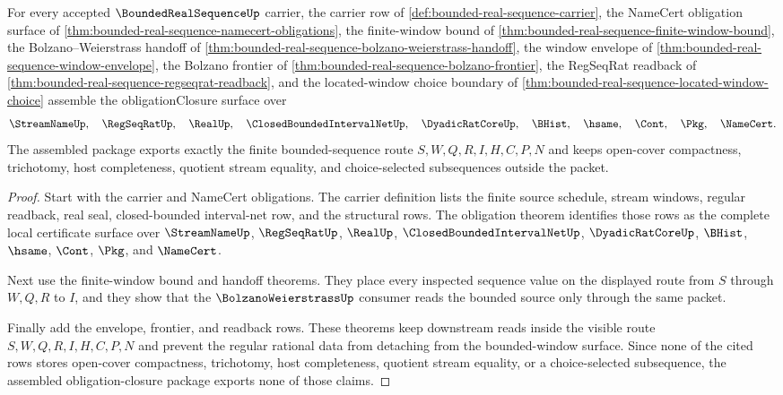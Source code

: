 \begin{theorem}
\label{thm:bounded-real-sequence-obligation-closure-package}
For every accepted $\BoundedRealSequenceUp$ carrier, the carrier row of \autoref{def:bounded-real-sequence-carrier}, the NameCert obligation surface of \autoref{thm:bounded-real-sequence-namecert-obligations}, the finite-window bound of \autoref{thm:bounded-real-sequence-finite-window-bound}, the Bolzano--Weierstrass handoff of \autoref{thm:bounded-real-sequence-bolzano-weierstrass-handoff}, the window envelope of \autoref{thm:bounded-real-sequence-window-envelope}, the Bolzano frontier of \autoref{thm:bounded-real-sequence-bolzano-frontier}, the RegSeqRat readback of \autoref{thm:bounded-real-sequence-regseqrat-readback}, and the located-window choice boundary of \autoref{thm:bounded-real-sequence-located-window-choice} assemble the obligationClosure surface over
$$
\StreamNameUp,\quad
\RegSeqRatUp,\quad
\RealUp,\quad
\ClosedBoundedIntervalNetUp,\quad
\DyadicRatCoreUp,\quad
\BHist,\quad
\hsame,\quad
\Cont,\quad
\Pkg,\quad
\NameCert .
$$
The assembled package exports exactly the finite bounded-sequence route $S,W,Q,R,I,H,C,P,N$ and keeps open-cover compactness, trichotomy, host completeness, quotient stream equality, and choice-selected subsequences outside the packet.
\end{theorem}
\begin{proof}
Start with the carrier and NameCert obligations. The carrier definition lists the finite source schedule, stream windows, regular readback, real seal, closed-bounded interval-net row, and the structural rows. The obligation theorem identifies those rows as the complete local certificate surface over $\StreamNameUp$, $\RegSeqRatUp$, $\RealUp$, $\ClosedBoundedIntervalNetUp$, $\DyadicRatCoreUp$, $\BHist$, $\hsame$, $\Cont$, $\Pkg$, and $\NameCert$.

Next use the finite-window bound and handoff theorems. They place every inspected sequence value on the displayed route from $S$ through $W,Q,R$ to $I$, and they show that the $\BolzanoWeierstrassUp$ consumer reads the bounded source only through the same packet.

Finally add the envelope, frontier, and readback rows. These theorems keep downstream reads inside the visible route $S,W,Q,R,I,H,C,P,N$ and prevent the regular rational data from detaching from the bounded-window surface. Since none of the cited rows stores open-cover compactness, trichotomy, host completeness, quotient stream equality, or a choice-selected subsequence, the assembled obligation-closure package exports none of those claims.
\end{proof}

